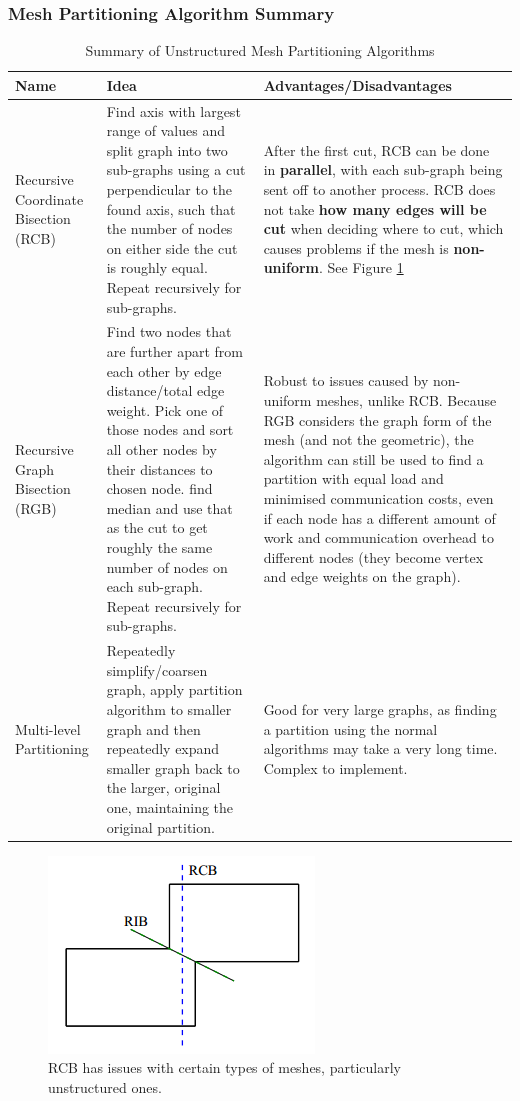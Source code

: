 \documentclass{article}
\begin{document}
\subsubsection{Mesh Partitioning Algorithm Summary}

\begin{table}[H]
	\centering
	\begin{tabular}{|p{4.5cm}|p{6cm}|p{5.5cm}|}
		\hline
		\textbf{Name} & \textbf{Idea} & \textbf{Advantages/Disadvantages} \\
		\hline
		Recursive Coordinate Bisection (RCB) & Find axis with largest range of values and split graph into two sub-graphs using a cut perpendicular to the found axis, such that the number of nodes on either side the cut is roughly equal. Repeat recursively for sub-graphs. & After the first cut, RCB can be done in \textbf{parallel}, with each sub-graph being sent off to another process. RCB does not take \textbf{how many edges will be cut} when deciding where to cut, which causes problems if the mesh is \textbf{non-uniform}. See Figure \ref{fig:rcb-issue} \\
		Recursive Graph Bisection (RGB) &  Find two nodes that are further apart from each other by edge distance/total edge weight. Pick one of those nodes and sort all other nodes by their distances to chosen node. find median and use that as the cut to get roughly the same number of nodes on each sub-graph. Repeat recursively for sub-graphs. & Robust to issues caused by non-uniform meshes, unlike RCB. Because RGB considers the graph form of the mesh (and not the geometric), the algorithm can still be used to find a partition with equal load and minimised communication costs, even if each node has a different amount of work and communication overhead to different nodes (they become vertex and edge weights on the graph). \\
		Multi-level Partitioning & Repeatedly simplify/coarsen graph, apply partition algorithm to smaller graph and then repeatedly expand smaller graph back to the larger, original one, maintaining the original partition. & Good for very large graphs, as finding a partition using the normal algorithms may take a very long time. Complex to implement. \\
		\hline
	\end{tabular}
	\caption{Summary of Unstructured Mesh Partitioning Algorithms}
\end{table}

\begin{figure}
	\centering
	\includegraphics[scale=0.8]{figures/rcb-issue.png}
	\caption{RCB has issues with certain types of meshes, particularly unstructured ones.}
	\label{fig:rcb-issue}
\end{figure}
\end{document}
